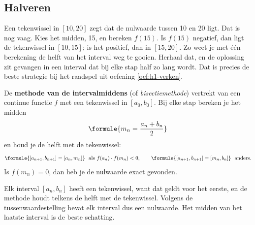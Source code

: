 \subsection{Halveren}

Een tekenwissel in $[10, 20]$ zegt dat de nulwaarde tussen 10 en 20 ligt. Dat is nog vaag. Kies het midden, 15, en bereken $f(15)$. Is $f(15)$ negatief, dan ligt de tekenwissel in $[10, 15]$; is het positief, dan in $[15, 20]$. Zo weet je met één berekening de helft van het interval weg te gooien. Herhaal dat, en de oplossing zit gevangen in een interval dat bij elke stap half zo lang wordt. Dat is precies de beste strategie bij het raadspel uit oefening \ref{oef:h1-verken}.

\begin{theorie}
De \textbf{\textcolor{accent}{methode van de intervalmiddens}} (of \textit{bisectiemethode}) vertrekt van een continue functie $f$ met een tekenwissel in $[a_0, b_0]$. Bij elke stap bereken je het midden
\[
\formule{m_n = \frac{a_n + b_n}{2}}
\]
en houd je de helft met de tekenwissel:
\[
\formule{[a_{n+1}, b_{n+1}] = [a_n, m_n]} \ \text{ als } f(a_n) \cdot f(m_n) < 0, \qquad \formule{[a_{n+1}, b_{n+1}] = [m_n, b_n]} \ \text{ anders.}
\]
Is $f(m_n) = 0$, dan heb je de nulwaarde exact gevonden.
\end{theorie}

Elk interval $[a_n, b_n]$ heeft een tekenwissel, want dat geldt voor het eerste, en de methode houdt telkens de helft met de tekenwissel. Volgens de tussenwaardestelling bevat elk interval dus een nulwaarde. Het midden van het laatste interval is de beste schatting.

